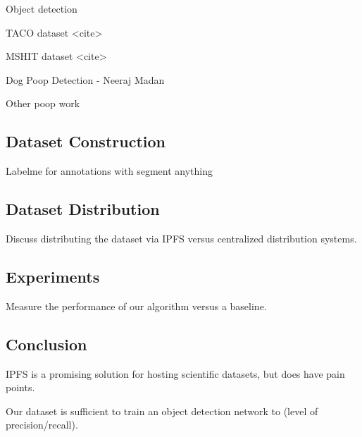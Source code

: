 \documentclass[10pt,twocolumn,letterpaper]{article}
\begin{document}
Object detection

TACO dataset <cite>

MSHIT dataset <cite>

Dog Poop Detection - Neeraj Madan

Other poop work

\subsection{Dataset Construction}

Labelme for annotations with segment anything

\subsection{Dataset Distribution}

Discuss distributing the dataset via IPFS versus centralized distribution
systems.

\subsection{Experiments}

Measure the performance of our algorithm versus a baseline.

\subsection{Conclusion}

IPFS is a promising solution for hosting scientific datasets, but does have pain points.

Our dataset is sufficient to train an object detection network to (level of
precision/recall).



{\small


}
\end{document}
